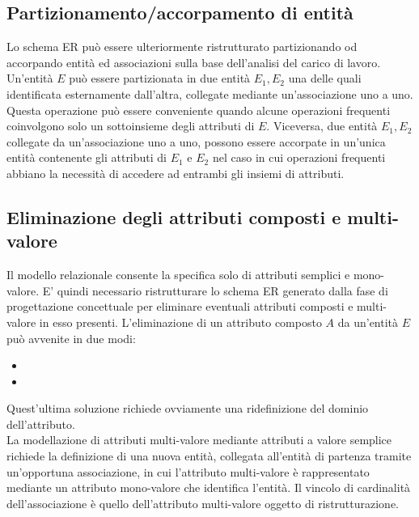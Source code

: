 \documentclass[12pt, a4paper]{report}
\begin{document}
    \subsection{Partizionamento/accorpamento di entità}
    Lo schema ER può essere ulteriormente ristrutturato partizionando od accorpando entità ed associazioni sulla base dell'analisi del carico di lavoro. Un'entità $E$ può essere partizionata in due entità $E_{1},E_{2}$ una delle quali identificata esternamente dall'altra, collegate mediante un'associazione uno a uno. Questa operazione può essere conveniente quando alcune operazioni frequenti coinvolgono solo un sottoinsieme degli attributi di $E$. Viceversa, due entità $E_{1},E_{2}$ collegate da un'associazione uno a uno, possono essere accorpate in un'unica entità contenente gli attributi di $E_{1}$ e $E_{2}$ nel caso in cui operazioni frequenti abbiano la necessità di accedere ad entrambi gli insiemi di attributi.
    \subsection{Eliminazione degli attributi composti e multi-valore}
    Il modello relazionale consente la specifica solo di attributi semplici e mono-valore. E' quindi necessario ristrutturare lo schema ER generato dalla fase di progettazione concettuale per eliminare eventuali attributi composti e multi-valore in esso presenti. L'eliminazione di un attributo composto $A$ da un'entità $E$ può avvenite in due modi:
    \begin{itemize}
        \item {}
        \item {}
    \end{itemize}
    Quest'ultima soluzione richiede ovviamente una ridefinizione del dominio dell'attributo.\\
    La modellazione di attributi multi-valore mediante attributi a valore semplice richiede la definizione di una nuova entità, collegata all'entità di partenza tramite un'opportuna associazione, in cui l'attributo multi-valore è rappresentato mediante un attributo mono-valore che identifica l'entità. Il vincolo di cardinalità dell'associazione è quello dell'attributo multi-valore oggetto di ristrutturazione.
\end{document}
